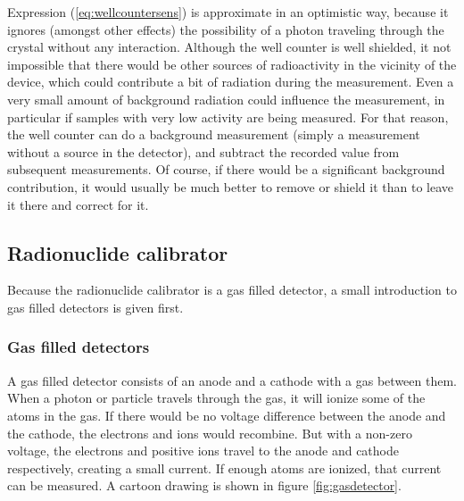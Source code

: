 \documentclass[11pt,oneside]{article}
\begin{document}
Expression (\ref{eq:wellcountersens}) is approximate in an optimistic
way, because it ignores (amongst other effects) the possibility of a
photon traveling through the crystal without any interaction.
Although the well counter is well shielded, it not impossible that
there would be other sources of radioactivity in the vicinity of the
device, which could contribute a bit of radiation during the
measurement. Even a very small amount of background radiation could
influence the measurement, in particular if samples with very low
activity are being measured. For that reason, the well counter can do
a background measurement (simply a measurement without a source in the
detector), and subtract the recorded value from subsequent
measurements. Of course, if there would be a significant background
contribution, it would usually be much better to remove or shield it
than to leave it there and correct for it.

\subsection{Radionuclide calibrator}
Because the radionuclide calibrator is a gas filled detector, a small introduction
to gas filled detectors is given first.

\subsubsection{Gas filled detectors}
A gas filled detector consists of an anode and a cathode with a gas
between them. When a photon or particle travels through the gas, it
will ionize some of the atoms in the gas. If there would be no voltage
difference between the anode and the cathode, the electrons and ions
would recombine. But with a non-zero voltage, the electrons and
positive ions travel to the anode and cathode respectively, creating
a small current. If enough atoms are ionized, that current can be
measured. A cartoon drawing is shown in figure \ref{fig:gasdetector}.
\end{document}
